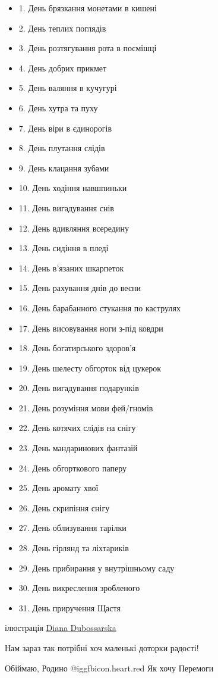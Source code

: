 \begin{itemize}
  \item 1. День брязкання монетами в кишені
  \item 2. День теплих поглядів
  \item 3. День розтягування рота в посмішці
  \item 4. День добрих прикмет
  \item 5. День валяння в кучугурі
  \item 6. День хутра та пуху
  \item 7. День віри в єдинорогів
  \item 8. День плутання слідів
  \item 9. День клацання зубами
  \item 10. День ходіння навшпиньки
  \item 11. День вигадування снів
  \item 12. День вдивляння всередину
  \item 13. День сидіння в пледі
  \item 14. День в'язаних шкарпеток
  \item 15. День рахування днів до весни
  \item 16. День барабанного стукання по каструлях
  \item 17. День висовування ноги з-під ковдри
  \item 18. День богатирського здоров'я
  \item 19. День шелесту обгорток від цукерок
  \item 20. День вигадування подарунків
  \item 21. День розуміння мови фей/гномів
  \item 22. День котячих слідів на снігу
  \item 23. День мандаринових фантазій
  \item 24. День обгорткового паперу
  \item 25. День аромату хвої
  \item 26. День скрипіння снігу
  \item 27. День облизування тарілки
  \item 28. День гірлянд та ліхтариків
  \item 29. День прибирання у внутрішньому саду
  \item 30. День викреслення зробленого
  \item 31. День приручення Щастя
\end{itemize}

ілюстрація \href{https://www.facebook.com/diana.dubossarskaart}{Diana Dubossarska}

Нам зараз так потрібні хоч маленькі доторки радості!

Обіймаю, Родино @igg{fbicon.heart.red} Як хочу Перемоги

